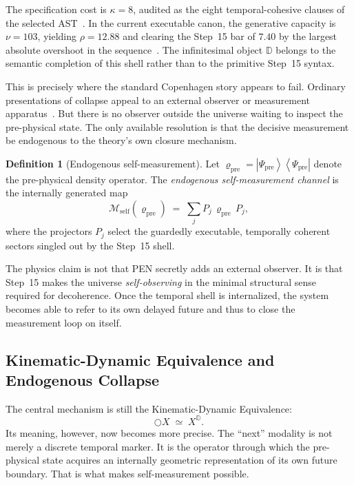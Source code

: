 \documentclass[11pt,a4paper]{article}
\theoremstyle{plain}
\theoremstyle{definition}
\newtheorem{definition}[theorem]{Definition}
\theoremstyle{remark}
\newcommand{\D}{\mathbb{D}}
\newcommand{\nextmod}{\bigcirc}
\providecommand{\ket}[1]{\left|#1\right\rangle}
\providecommand{\bra}[1]{\left\langle#1\right|}
\begin{document}
\noindent The specification cost is $\kappa = 8$, audited as the eight temporal-cohesive clauses of the selected AST~\cite{pen}.
In the current executable canon, the generative capacity is $\nu = 103$, yielding $\rho = 12.88$ and clearing the Step~15 bar of $7.40$ by the largest absolute overshoot in the sequence~\cite{pen}.
The infinitesimal object $\D$ belongs to the semantic completion of this shell rather than to the primitive Step~15 syntax.

This is precisely where the standard Copenhagen story appears to fail.
Ordinary presentations of collapse appeal to an external observer or measurement apparatus~\cite{von-neumann,schlosshauer,zurek-decoherence}.
But there is no observer outside the universe waiting to inspect the pre-physical state.
The only available resolution is that the decisive measurement be endogenous to the theory's own closure mechanism.

\begin{definition}[Endogenous self-measurement]
\label{def:self-measurement}
Let $\varrho_{\mathrm{pre}} = \ket{\Psi_{\mathrm{pre}}}\bra{\Psi_{\mathrm{pre}}}$ denote the pre-physical density operator.
The \emph{endogenous self-measurement channel} is the internally generated map
\begin{equation}
    \mathcal{M}_{\mathrm{self}}(\varrho_{\mathrm{pre}})
    \;=\;
    \sum_j P_j\,\varrho_{\mathrm{pre}}\,P_j,
\end{equation}
where the projectors $P_j$ select the guardedly executable, temporally coherent sectors singled out by the Step~15 shell.
\end{definition}

The physics claim is not that PEN secretly adds an external observer.
It is that Step~15 makes the universe \emph{self-observing} in the minimal structural sense required for decoherence.
Once the temporal shell is internalized, the system becomes able to refer to its own delayed future and thus to close the measurement loop on itself.

\subsection{Kinematic-Dynamic Equivalence and Endogenous Collapse}
\label{sec:kde-collapse}

The central mechanism is still the Kinematic-Dynamic Equivalence:
\begin{equation}
    \nextmod X \;\simeq\; X^{\D}.
\end{equation}
Its meaning, however, now becomes more precise.
The ``next'' modality is not merely a discrete temporal marker.
It is the operator through which the pre-physical state acquires an internally geometric representation of its own future boundary.
That is what makes self-measurement possible.
\end{document}
